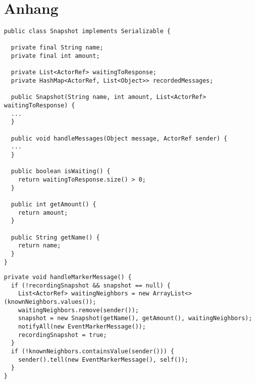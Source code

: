 \section*{Anhang}
\label{sec:appendix}

\begin{lstlisting}[style=java,caption={Snapshot Klasse mit Methoden},label=lst:sclass]
public class Snapshot implements Serializable {

  private final String name;
  private final int amount;

  private List<ActorRef> waitingToResponse;
  private HashMap<ActorRef, List<Object>> recordedMessages;

  public Snapshot(String name, int amount, List<ActorRef> waitingToResponse) {
  ...
  }
  
  public void handleMessages(Object message, ActorRef sender) {
  ...
  }
  
  public boolean isWaiting() {
    return waitingToResponse.size() > 0;
  }
  
  public int getAmount() {
    return amount;
  }

  public String getName() {
    return name;
  }
}
\end{lstlisting}

\begin{lstlisting}[style=java,caption={Handler wenn eine Maker Nachricht den Knoten erreicht}, label=lst:makerHandler]
private void handleMarkerMessage() {
  if (!recordingSnapshot && snapshot == null) {
    List<ActorRef> waitingNeighbors = new ArrayList<>(knownNeighbors.values());
    waitingNeighbors.remove(sender());
    snapshot = new Snapshot(getName(), getAmount(), waitingNeighbors);
    notifyAll(new EventMarkerMessage());
    recordingSnapshot = true;
  }
  if (!knownNeighbors.containsValue(sender())) {
    sender().tell(new EventMarkerMessage(), self());
  }
}
\end{lstlisting}

